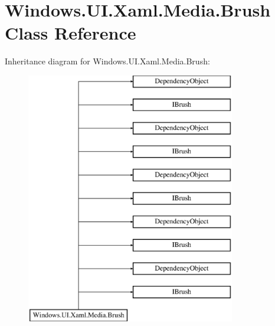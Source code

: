 \hypertarget{class_windows_1_1_u_i_1_1_xaml_1_1_media_1_1_brush}{}\section{Windows.\+U\+I.\+Xaml.\+Media.\+Brush Class Reference}
\label{class_windows_1_1_u_i_1_1_xaml_1_1_media_1_1_brush}
Inheritance diagram for Windows.\+U\+I.\+Xaml.\+Media.\+Brush\+:\begin{figure}[H]
\begin{center}
\leavevmode
\includegraphics[height=11.000000cm]{class_windows_1_1_u_i_1_1_xaml_1_1_media_1_1_brush}
\end{center}
\end{figure}
